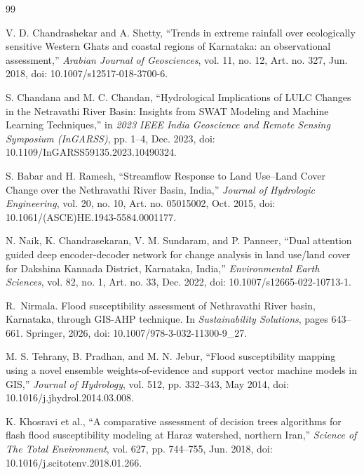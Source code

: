 \documentclass[10pt,twocolumn]{article}
\begin{document}
\balance
{\fontsize{8}{9.5}\selectfont
\begin{thebibliography}{99}
\setlength{\itemsep}{0pt}

V. D. Chandrashekar and A. Shetty, ``Trends in extreme rainfall over ecologically sensitive Western Ghats and coastal regions of Karnataka: an observational assessment,'' \emph{Arabian Journal of Geosciences}, vol. 11, no. 12, Art. no. 327, Jun. 2018, doi: 10.1007/s12517-018-3700-6.

S. Chandana and M. C. Chandan, ``Hydrological Implications of LULC Changes in the Netravathi River Basin: Insights from SWAT Modeling and Machine Learning Techniques,'' in \emph{2023 IEEE India Geoscience and Remote Sensing Symposium (InGARSS)}, pp. 1--4, Dec. 2023, doi: 10.1109/InGARSS59135.2023.10490324.

S. Babar and H. Ramesh, ``Streamflow Response to Land Use--Land Cover Change over the Nethravathi River Basin, India,'' \emph{Journal of Hydrologic Engineering}, vol. 20, no. 10, Art. no. 05015002, Oct. 2015, doi: 10.1061/(ASCE)HE.1943-5584.0001177.

N. Naik, K. Chandrasekaran, V. M. Sundaram, and P. Panneer, ``Dual attention guided deep encoder-decoder network for change analysis in land use/land cover for Dakshina Kannada District, Karnataka, India,'' \emph{Environmental Earth Sciences}, vol. 82, no. 1, Art. no. 33, Dec. 2022, doi: 10.1007/s12665-022-10713-1.

R.~Nirmala. Flood susceptibility assessment of Nethravathi River basin, Karnataka, through GIS-AHP technique. In \emph{Sustainability Solutions}, pages 643--661. Springer, 2026, doi: 10.1007/978-3-032-11300-9\_27.

M. S. Tehrany, B. Pradhan, and M. N. Jebur, ``Flood susceptibility mapping using a novel ensemble weights-of-evidence and support vector machine models in GIS,'' \emph{Journal of Hydrology}, vol. 512, pp. 332--343, May 2014, doi: 10.1016/j.jhydrol.2014.03.008.

K. Khosravi et al., ``A comparative assessment of decision trees algorithms for flash flood susceptibility modeling at Haraz watershed, northern Iran,'' \emph{Science of The Total Environment}, vol. 627, pp. 744--755, Jun. 2018, doi: 10.1016/j.scitotenv.2018.01.266.


\end{thebibliography}}
\end{document}
